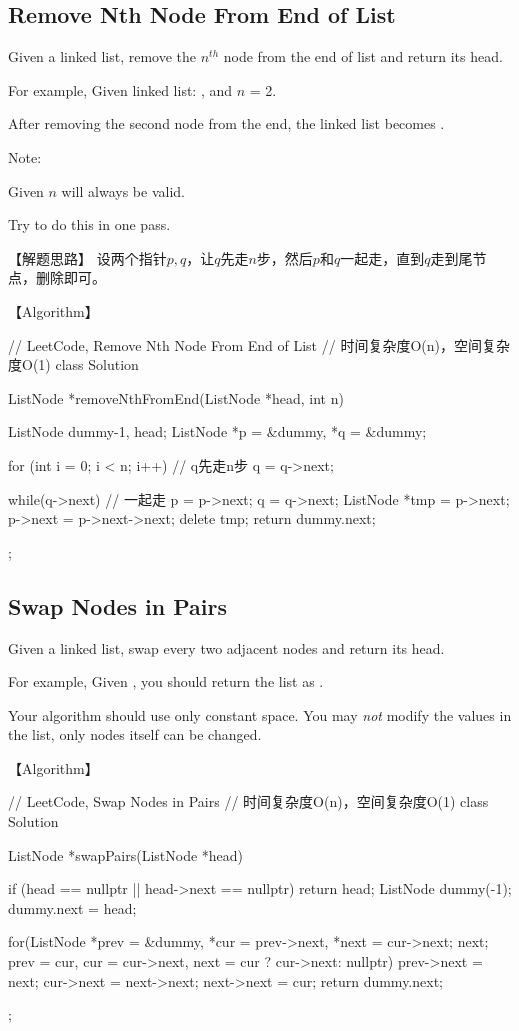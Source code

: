 \subsection{Remove Nth Node From End of List}
\label{sec:remove-nth-node-from-end-of-list}



Given a linked list, remove the $n^{th}$ node from the end of list and return
its head.

For example, Given linked list: , and $n$ = 2.

After removing the second node from the end, the linked list becomes
.

Note:
\begindot
\item Given $n$ will always be valid.
\item Try to do this in one pass.
\myenddot


【解题思路】
设两个指针$p,q$，让$q$先走$n$步，然后$p$和$q$一起走，直到$q$走到尾节点，删除即可。


【Algorithm】
\begin{Code}
	// LeetCode, Remove Nth Node From End of List
	// 时间复杂度O(n)，空间复杂度O(1)
	class Solution {
		ListNode *removeNthFromEnd(ListNode *head, int n) {
			ListNode dummy{-1, head};
			ListNode *p = &dummy, *q = &dummy;
			
			for (int i = 0; i < n; i++)  // q先走n步
				q = q->next;
			
			while(q->next) { // 一起走
				p = p->next;
				q = q->next;
			}
			ListNode *tmp = p->next;
			p->next = p->next->next;
			delete tmp;
			return dummy.next;
		}
	};
\end{Code}


\subsection{Swap Nodes in Pairs}
\label{sec:swap-nodes-in-pairs}



Given a linked list, swap every two adjacent nodes and return its head.

For example,
Given , you should return the list as .

Your algorithm should use only constant space. You may \emph{not} modify the
values in the list, only nodes itself can be changed.


【Algorithm】
\begin{Code}
	// LeetCode, Swap Nodes in Pairs
	// 时间复杂度O(n)，空间复杂度O(1)
	class Solution {
		ListNode *swapPairs(ListNode *head) {
			if (head == nullptr || head->next == nullptr) return head;
			ListNode dummy(-1);
			dummy.next = head;
			
			for(ListNode *prev = &dummy, *cur = prev->next, *next = cur->next; next;
				prev = cur, cur = cur->next, next = cur ? cur->next: nullptr) {
				prev->next = next;
				cur->next = next->next;
				next->next = cur;
			}
			return dummy.next;
		}
	};
\end{Code}

